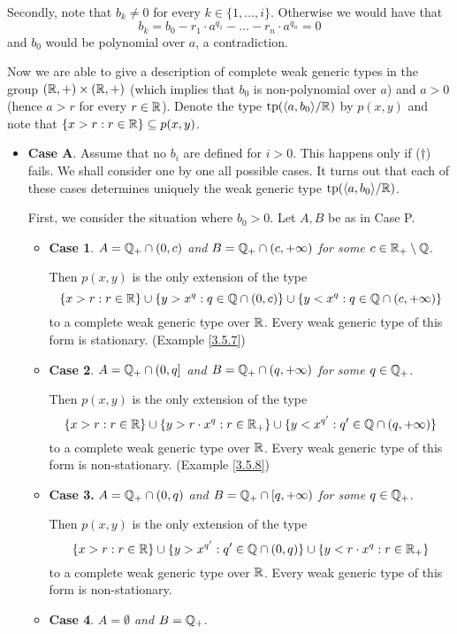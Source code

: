 \documentclass[11pt]{article}
\begin{document}
Secondly, note that \(b_k\neq 0\) for every \(k\in\{1,\dots,i\}\). Otherwise we would have that
\begin{equation*}
b_k=b_0-r_1\cdot a^{q_1}-\dots-r_n\cdot a^{q_n}=0
\end{equation*}
and \(b_0\) would be polynomial over \(a\), a contradiction.

Now we are able to give a description of complete weak generic types in the
group \((\mathbb{R},+)\times(\mathbb{R},+)\) (which implies that \(b_0\) is non-polynomial over \(a\)) and \(a>0\)
(hence \(a>r\) for every \(r\in\mathbb{R}\)). Denote the type \(\operatorname{tp}(\langle a,b_0\rangle/\mathbb{R})\) by \(p(x,y)\) and note
that \(\{x>r:r\in\mathbb{R}\}\subseteq p(x,y)\).

\begin{itemize}
\item \textbf{Case A}. Assume that no \(b_i\) are defined for \(i>0\). This happens only if (\(\dagger\)) fails. We
shall consider one by one all possible cases. It turns out that each of these cases determines
uniquely the weak generic type \(\operatorname{tp}(\langle a,b_0\rangle/\mathbb{R})\).

First, we consider the situation where \(b_0>0\). Let \(A,B\) be as in Case P.
\begin{itemize}
\item \textbf{Case 1}. \emph{\(A=\mathbb{Q}_+\cap(0,c)\) and \(B=\mathbb{Q}_+\cap(c,+\infty)\) for some \(c\in\mathbb{R}_+\setminus\mathbb{Q}\)}.

Then \(p(x,y)\) is the only extension of the type
\begin{equation*}
\{x>r:r\in\mathbb{R}\}\cup\{y>x^q:q\in\mathbb{Q}\cap(0,c)\}\cup\{y<x^q:q\in\mathbb{Q}\cap(c,+\infty)\}
\end{equation*}
to a complete weak generic type over \(\mathbb{R}\). Every weak generic type of this form is
stationary. (Example \ref{3.5.7})
\item \textbf{Case 2}. \emph{\(A=\mathbb{Q}_+\cap(0,q]\) and \(B=\mathbb{Q}_+\cap(q,+\infty)\) for some \(q\in\mathbb{Q}_+\).}

Then \(p(x,y)\) is the only extension of the type
\begin{equation*}
\{x>r:r\in\mathbb{R}\}\cup\{y>r\cdot x^q:r\in\mathbb{R}_+\}\cup\{y<x^{q'}:q'\in\mathbb{Q}\cap(q,+\infty)\}
\end{equation*}
to a complete weak generic type over \(\mathbb{R}\). Every weak generic type of this form is
non-stationary. (Example \ref{3.5.8})
\item \textbf{Case 3.} \emph{\(A=\mathbb{Q}_+\cap(0,q)\) and \(B=\mathbb{Q}_+\cap[q,+\infty)\) for some \(q\in\mathbb{Q}_+\)}.

Then \(p(x,y)\) is the only extension of the type
\begin{equation*}
\{x>r:r\in\mathbb{R}\}\cup\{y>x^{q'}:q'\in\mathbb{Q}\cap(0,q)\}\cup\{y<r\cdot x^q:r\in\mathbb{R}_+\}
\end{equation*}
to a complete weak generic type over \(\mathbb{R}\). Every weak generic type of this form is
non-stationary.
\item \textbf{Case 4}. \emph{\(A=\emptyset\) and \(B=\mathbb{Q}_+\)}.


\end{itemize}
\end{itemize}
\end{document}
